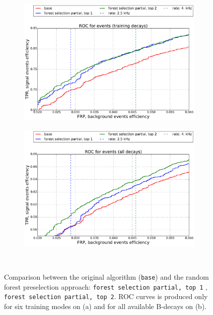 \documentclass{llncs}
\begin{document}
\begin{figure}
	\begin{center}
    	\begin{subfigure}[b]{0.45\textwidth}
    		\includegraphics[width=\textwidth]{../../img/roc_training_top_partial} \caption{}
    	\end{subfigure} %
    	\begin{subfigure}[b]{0.45\textwidth}
    		\includegraphics[width=\textwidth]{../../img/roc_all_top_partial} \caption{} %
    	\end{subfigure}
    \end{center}
  \caption{Comparison between the original algorithm (\texttt{base}) and the random forest preselection approach: \texttt{forest selection partial, top 1} , \texttt{forest selection partial, top 2}. ROC curves is produced only for six training modes on (a) and for all available B-decays on (b).}~\label{fig:forest_partial}
\end{figure}
\end{document}
